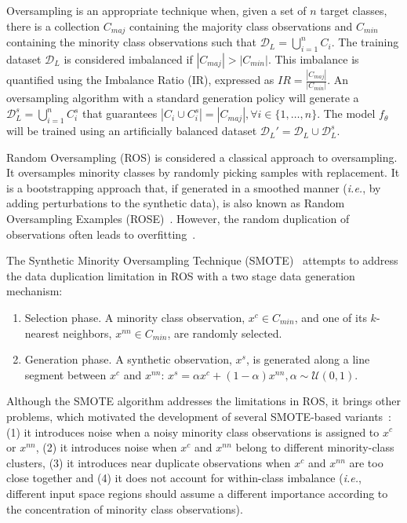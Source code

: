 \documentclass[parskip=full]{scrartcl}
\begin{document}
Oversampling is an appropriate technique when, given a set of $n$ target
classes, there is a collection $C_{maj}$ containing the majority class
observations and $C_{min}$ containing the minority class observations such
that $\mathcal{D}_L = \bigcup^n_{i=1} C_i$. The training dataset
$\mathcal{D}_L$ is considered imbalanced if $|C_{maj}| > |C_{min}|$. This
imbalance is quantified using the Imbalance Ratio (IR), expressed as $IR =
\frac{|C_{maj}|}{|C_{min}|}$. An oversampling algorithm with a standard
generation policy will generate a $\mathcal{D}_L^s = \bigcup^n_{i=1} C_i^s$
that guarantees $|C_i \cup C_i^s| = |C_{maj}|, \forall i \in \{1, \ldots,
n\}$. The model $f_\theta$ will be trained using an artificially balanced
dataset $\mathcal{D}_L' = \mathcal{D}_L \cup \mathcal{D}_L^s$.

Random Oversampling (ROS) is considered a classical approach to oversampling.
It oversamples minority classes by randomly picking samples with replacement.
It is a bootstrapping approach that, if generated in a smoothed manner
(\textit{i.e.}, by adding perturbations to the synthetic data), is also
known as Random Oversampling Examples (ROSE)~\cite{menardi2014training}.
However, the random duplication of observations often leads to
overfitting~\cite{krawczyk2016learning}.

The Synthetic Minority Oversampling Technique (SMOTE)~\cite{chawla2002smote}
attempts to address the data duplication limitation in ROS with a two stage 
data generation mechanism:

\begin{enumerate}

    \item Selection phase. A minority class observation, $x^c \in C_{min}$,
        and one of its $k$-nearest neighbors, $x^{nn} \in C_{min}$, are
        randomly selected.

    \item Generation phase. A synthetic observation, $x^s$, is generated along
        a line segment between $x^c$ and $x^{nn}$: $x^s = \alpha x^c +
        (1-\alpha)x^{nn}, \alpha \sim \mathcal{U}(0, 1)$.

\end{enumerate}

Although the SMOTE algorithm addresses the limitations in ROS, it brings other
problems, which motivated the development of several SMOTE-based
variants~\cite{douzas2019geometric}: (1) it introduces noise when a noisy
minority class observations is assigned to $x^c$ or $x^{nn}$, (2) it
introduces noise when $x^c$ and $x^{nn}$ belong to different minority-class
clusters, (3) it introduces near duplicate observations when $x^c$ and
$x^{nn}$ are too close together and (4) it does not account for within-class
imbalance (\textit{i.e.}, different input space regions should assume a
different importance according to the concentration of minority class
observations).
\end{document}
